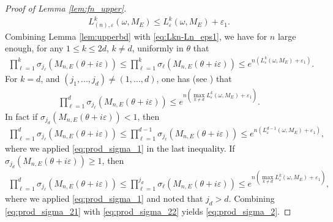 \documentclass[11pt]{amsart}
\begin{document}
\begin{proof}[Proof of Lemma \ref{lem:fn_upper}]
\begin{align}\label{eq:Lkn-Ln_eps1}
    L^k_{(n),\varepsilon}(\omega,M_E)\leq L^k_{\varepsilon}(\omega,M_E)+\varepsilon_1.
\end{align}
Combining Lemma \ref{lem:upperbd} with \eqref{eq:Lkn-Ln_eps1},
we have for $n$ large enough, for any $1\leq k\leq 2d$, $k\neq d$, uniformly in $\theta$ that
\begin{align}\label{eq:prod_sigma_1}
    \prod_{\ell=1}^k \sigma_{j_{\ell}}(M_{n,E}(\theta+i\varepsilon))\leq \prod_{\ell=1}^k \sigma_{\ell}(M_{n,E}(\theta+i\varepsilon))
    \leq e^{n(L^k_{\varepsilon}(\omega,M_E)+\varepsilon_1)}.
\end{align}
For $k=d$, and $(j_1,...,j_d)\neq (1,...,d)$, one has (see \cite[Lemma 5.11]{HS3}) that 
\begin{align}\label{eq:prod_sigma_2}
\prod_{\ell=1}^d \sigma_{j_{\ell}}(M_{n,E}(\theta+i\varepsilon))\leq e^{n(\max_{k\neq d} L^k_{\varepsilon}(\omega,M_E)+\varepsilon_1)}.
\end{align}
In fact if $\sigma_{j_d}(M_{n,E}(\theta+i\varepsilon))<1$, then
\begin{align}\label{eq:prod_sigma_21}
    \prod_{\ell=1}^d \sigma_{j_{\ell}}(M_{n,E}(\theta+i\varepsilon))\leq 
    \prod_{\ell=1}^{d-1} \sigma_{j_{\ell}}(M_{n,E}(\theta+i\varepsilon))\leq e^{n(L^{d-1}_{\varepsilon}(\omega,M_E)+\varepsilon_1)},
\end{align}
where we applied \eqref{eq:prod_sigma_1} in the last inequality. 
If $\sigma_{j_d}(M_{n,E}(\theta+i\varepsilon))\geq 1$, then
\begin{align}\label{eq:prod_sigma_22}
    \prod_{\ell=1}^d \sigma_{j_{\ell}}(M_{n,E}(\theta+i\varepsilon))\leq 
    \prod_{\ell=1}^{j_d} \sigma_{{\ell}}(M_{n,E}(\theta+i\varepsilon))\leq e^{n(\max_{k\neq d} L^{k}_{\varepsilon}(\omega,M_E)+\varepsilon_1)},
\end{align}
where we applied \eqref{eq:prod_sigma_1} and noted that $j_d>d$.
Combining \eqref{eq:prod_sigma_21} with \eqref{eq:prod_sigma_22} yields \eqref{eq:prod_sigma_2}.


\end{proof}
\end{document}
